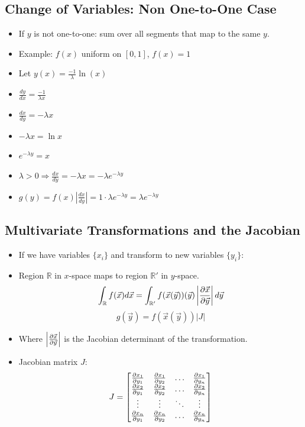 \subsection{Change of Variables: Non One-to-One Case}
\begin{itemize}
      \item If $y$ is not one-to-one: sum over all segments that map to the same $y$.
      \item Example: $f(x)$ uniform on $[0,1]$, $f(x) = 1$
      \item Let $y(x) = \frac{-1}{\lambda} \ln(x)$
      \item $\frac{dy}{dx} = \frac{-1}{\lambda x}$
      \item $\frac{dx}{dy} = -\lambda x$
      \item $-\lambda x = \ln{x}$
      \item $e^{-\lambda y} = x$
      \item $\lambda > 0 \Rightarrow \frac{dx}{dy} = - \lambda x = -\lambda e^{-\lambda y}$
      \item $ g(y) = f(x) \left| \frac{dx}{dy} \right| = 1 \cdot \lambda e^{-\lambda y} = \lambda e^{-\lambda y}$
\end{itemize}

\subsection{Multivariate Transformations and the Jacobian}
\begin{itemize}
      \item If we have variables $\{x_i\}$ and transform to new variables $\{y_i\}$:
      \item Region $\mathbb{R}$ in $x$-space maps to region $\mathbb{R'}$ in $y$-space.
            \[ \int_{\mathbb{R}} f(\vec{x}) d\vec{x} = \int_{\mathbb{R'}} f(\vec{x}(\vec{y}))(\vec{y}) \left| \pdv{\vec{x}}{\vec{y}} \right| d\vec{y} \]
            \[ g(\vec{y}) = f(\vec{x}(\vec{y})) \left| J \right| \]
      \item Where $\left|\pdv{\vec{x}}{\vec{y}} \right|$ is the Jacobian determinant of the transformation.
      \item Jacobian matrix $J$:
            \[ J = \begin{bmatrix}
                        \pdv{x_1}{y_1} & \pdv{x_1}{y_2} & \ldots & \pdv{x_1}{y_n} \\
                        \pdv{x_2}{y_1} & \pdv{x_2}{y_2} & \ldots & \pdv{x_2}{y_n} \\
                        \vdots         & \vdots         & \ddots & \vdots         \\
                        \pdv{x_n}{y_1} & \pdv{x_n}{y_2} & \ldots & \pdv{x_n}{y_n}
                  \end{bmatrix} \]
\end{itemize}

